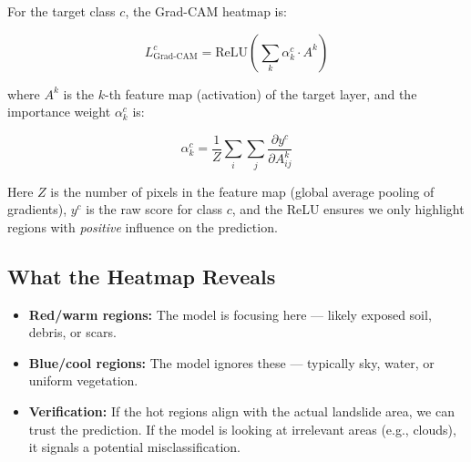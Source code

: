\documentclass[11pt]{article}
\begin{document}
For the target class $c$, the Grad-CAM heatmap is:

\[
L_{\text{Grad-CAM}}^{c} = \text{ReLU}\!\left(\sum_k \alpha_k^c \cdot A^k\right)
\]

where $A^k$ is the $k$-th feature map (activation) of the target layer, and the importance weight $\alpha_k^c$ is:

\[
\alpha_k^c = \frac{1}{Z} \sum_i \sum_j \frac{\partial y^c}{\partial A^k_{ij}}
\]

Here $Z$ is the number of pixels in the feature map (global average pooling of gradients), $y^c$ is the raw score for class $c$, and the ReLU ensures we only highlight regions with \textit{positive} influence on the prediction.

\subsection{What the Heatmap Reveals}

\begin{center}
\end{center}

\begin{itemize}[noitemsep]
    \item \textbf{Red/warm regions:} The model is focusing here --- likely exposed soil, debris, or scars.
    \item \textbf{Blue/cool regions:} The model ignores these --- typically sky, water, or uniform vegetation.
    \item \textbf{Verification:} If the hot regions align with the actual landslide area, we can trust the prediction. If the model is looking at irrelevant areas (e.g., clouds), it signals a potential misclassification.
\end{itemize}
\end{document}
